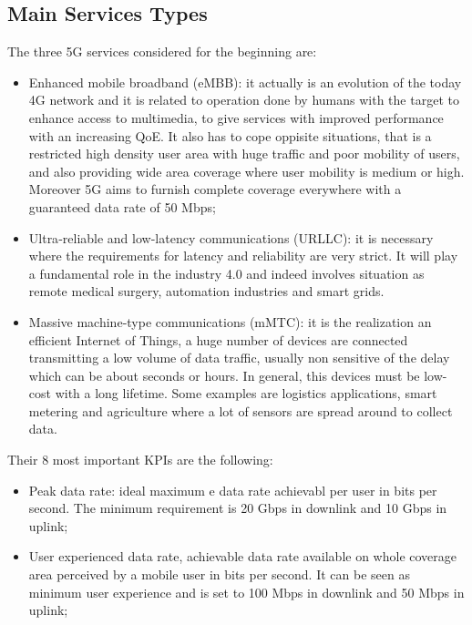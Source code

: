 \documentclass[a4paper,12pt]{report} %
\begin{document}
\subsection{Main Services Types}
The three 5G services considered for the beginning are:
\begin{itemize}
\item Enhanced mobile broadband (eMBB): it actually is an evolution of the today 4G network and it is related to operation done by humans with the target to enhance access to multimedia, to give services with improved performance with an increasing QoE. It also has to cope oppisite situations, that is a restricted high density user area with huge traffic and poor mobility of users, and also providing wide area coverage where user mobility is medium or high. Moreover 5G aims to furnish complete coverage everywhere with a guaranteed data rate of 50 Mbps;
\end{itemize}
\begin{itemize}
\item Ultra‐reliable and low-latency communications (URLLC): it is necessary where the requirements for latency and reliability are very strict. It will play a fundamental role in the industry 4.0 and indeed involves situation as remote medical surgery, automation industries and smart grids.
\end{itemize}
\begin{itemize}
\item Massive machine‐type communications (mMTC): it is the realization an efficient Internet of Things, a huge number of devices are connected transmitting a low volume of data traffic, usually non sensitive of the delay which can be about seconds or hours. In general, this devices must be
low-cost with a long lifetime. Some examples are logistics applications, smart metering and agriculture where a lot of sensors are spread around to collect data.
\end{itemize}
Their 8 most important KPIs are the following:
\begin{itemize}
\item Peak data rate: ideal maximum e data rate achievabl per user in bits per second. The minimum requirement is 20 Gbps in downlink and 10 Gbps in uplink;
\end{itemize}
\begin{itemize}
\item User experienced data rate, achievable data rate available on whole coverage area perceived by a mobile user in bits per second. It can be seen as minimum user experience and is set to
100 Mbps in downlink and 50 Mbps in uplink;
\end{itemize}
\end{document}
